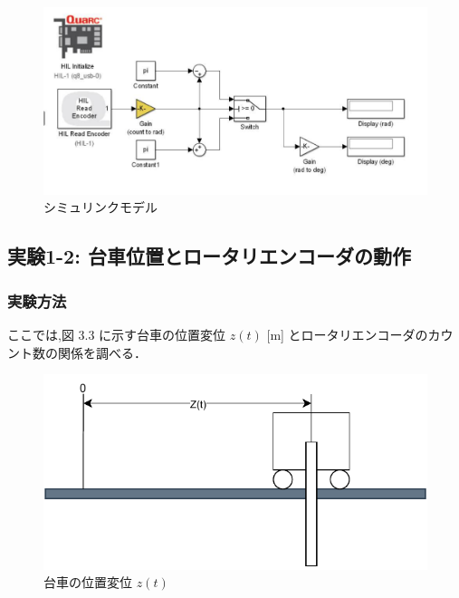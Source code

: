 \begin{figure}[h]
  \centering
  \includegraphics[scale=0.9]{sozai/pendcount3.pdf}
  \caption{シミュリンクモデル}
\end{figure}


\subsection{実験1-2: 台車位置とロータリエンコーダの動作}

\subsubsection{実験方法}
ここでは,図 3.3 に示す台車の位置変位 \( z(t) \) [m] とロータリエンコーダのカウント数の関係を調べる．

\begin{figure}[h]
  \centering
  \includegraphics[scale=1]{sozai/daisyanoichihenni.pdf}
  \caption{台車の位置変位 \( z(t) \)}
\end{figure}


